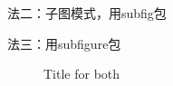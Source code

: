 \documentclass{article}
\begin{document}
\begin{CJK}{UTF8}{gbsn}
法二：子图模式，用subfig包

法三：用subfigure包
\begin{figure}
	\hfill
	\hfill
	\hfill
	\caption{Title for both}
\end{figure}












\end{CJK}
\end{document}
